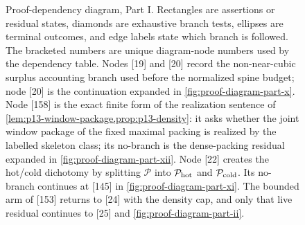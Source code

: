 \documentclass[11pt]{article}
\begin{document}
\begin{figure}[p]
\caption[Proof-dependency diagram, Part I]{Proof-dependency diagram, Part I.  Rectangles are assertions or residual states, diamonds are exhaustive branch tests, ellipses are terminal outcomes, and edge labels state which branch is followed.  The bracketed numbers are unique diagram-node numbers used by the dependency table.  Nodes [19] and [20] record the non-near-cubic surplus accounting branch used before the normalized spine budget; node [20] is the continuation expanded in \cref{fig:proof-diagram-part-x}.  Node [158] is the exact finite form of the realization sentence of \cref{lem:p13-window-package,prop:p13-density}: it asks whether the joint window package of the fixed maximal packing is realized by the labelled skeleton class; its no-branch is the dense-packing residual expanded in \cref{fig:proof-diagram-part-xii}.  Node [22] creates the hot/cold dichotomy by splitting $\mathcal P$ into $\mathcal P_{\rm hot}$ and $\mathcal P_{\rm cold}$.  Its no-branch continues at [145] in \cref{fig:proof-diagram-part-xi}.  The bounded arm of [153] returns to [24] with the density cap, and only that live residual continues to [25] and \cref{fig:proof-diagram-part-ii}.}
\label{fig:proof-diagram-part-i}
\end{figure}
\end{document}
